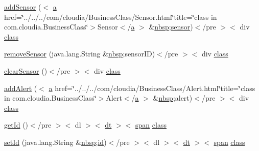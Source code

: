 \begin{DoxyCompactItemize}
\item 
\hyperlink{_station_8html_ae1dfbc1417e4604821d7721b67c8c43a}{add\-Sensor} ($<$ \hyperlink{style_8css_a5e8981582017bb8b84c21f148345d1f7}{a} href=\char`\"{}../../../com/cloudia/Business\-Class/Sensor.\-html\char`\"{}title=\char`\"{}class in com.\-cloudia.\-Business\-Class\char`\"{}$>$Sensor$<$/\hyperlink{style_8css_a5e8981582017bb8b84c21f148345d1f7}{a} $>$ \&\hyperlink{_tools_8html_aef915316f784c9063d942974538301a6}{nbsp};\hyperlink{index-17_8html_a473de8198e1708e7f705d9a565cff824}{sensor})$<$/pre $>$$<$ div \hyperlink{_tools_8html_acf06f836132665ba8114f5a414c2403f}{class}
\item 
\hyperlink{_station_8html_acba5decf3372a208ca465d4569b42a38}{remove\-Sensor} (java.\-lang.\-String \&\hyperlink{_tools_8html_aef915316f784c9063d942974538301a6}{nbsp};sensor\-I\-D)$<$/pre $>$$<$ div \hyperlink{_tools_8html_acf06f836132665ba8114f5a414c2403f}{class}
\item 
\hyperlink{_station_8html_af04f4613f2a6e57d727bbcaaa1039df0}{clear\-Sensor} ()$<$/pre $>$$<$ div \hyperlink{_tools_8html_acf06f836132665ba8114f5a414c2403f}{class}
\item 
\hyperlink{_station_8html_af866804fad58f798f141b42e9232ffbb}{add\-Alert} ($<$ \hyperlink{style_8css_a5e8981582017bb8b84c21f148345d1f7}{a} href=\char`\"{}../../../com/cloudia/Business\-Class/Alert.\-html\char`\"{}title=\char`\"{}class in com.\-cloudia.\-Business\-Class\char`\"{}$>$Alert$<$/\hyperlink{style_8css_a5e8981582017bb8b84c21f148345d1f7}{a} $>$ \&\hyperlink{_tools_8html_aef915316f784c9063d942974538301a6}{nbsp};alert)$<$/pre $>$$<$ div \hyperlink{_tools_8html_acf06f836132665ba8114f5a414c2403f}{class}
\item 
\hyperlink{_station_8html_ab3a0e513db813f22df2ca23e118d35a9}{get\-Id} ()$<$/pre $>$$<$ dl $>$$<$ \hyperlink{stylesheet_8css_a107565fb4039d33b041380d6e0ea1d80}{dt} $>$$<$ \hyperlink{stylesheet_8css_a8343996ebcf16220b04e54659aac31cc}{span} \hyperlink{_tools_8html_acf06f836132665ba8114f5a414c2403f}{class}
\item 
\hyperlink{_station_8html_a22720539ad9bd3e4500a4ffcd7a3b702}{set\-Id} (java.\-lang.\-String \&\hyperlink{_tools_8html_aef915316f784c9063d942974538301a6}{nbsp};\hyperlink{index-9_8html_aa9b8ff1d03b739d1e752b9d9a5aa7c98}{id})$<$/pre $>$$<$ dl $>$$<$ \hyperlink{stylesheet_8css_a107565fb4039d33b041380d6e0ea1d80}{dt} $>$$<$ \hyperlink{stylesheet_8css_a8343996ebcf16220b04e54659aac31cc}{span} \hyperlink{_tools_8html_acf06f836132665ba8114f5a414c2403f}{class}
\item 

\end{DoxyCompactItemize}
